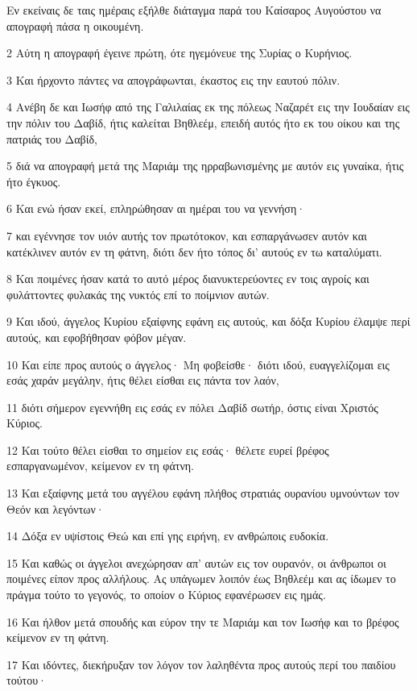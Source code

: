 \par Εν εκείναις δε ταις ημέραις εξήλθε διάταγμα παρά του Καίσαρος Αυγούστου να απογραφή πάσα η οικουμένη.
\par 2 Αύτη η απογραφή έγεινε πρώτη, ότε ηγεμόνευε της Συρίας ο Κυρήνιος.
\par 3 Και ήρχοντο πάντες να απογράφωνται, έκαστος εις την εαυτού πόλιν.
\par 4 Ανέβη δε και Ιωσήφ από της Γαλιλαίας εκ της πόλεως Ναζαρέτ εις την Ιουδαίαν εις την πόλιν του Δαβίδ, ήτις καλείται Βηθλεέμ, επειδή αυτός ήτο εκ του οίκου και της πατριάς του Δαβίδ,
\par 5 διά να απογραφή μετά της Μαριάμ της ηρραβωνισμένης με αυτόν εις γυναίκα, ήτις ήτο έγκυος.
\par 6 Και ενώ ήσαν εκεί, επληρώθησαν αι ημέραι του να γεννήση·
\par 7 και εγέννησε τον υιόν αυτής τον πρωτότοκον, και εσπαργάνωσεν αυτόν και κατέκλινεν αυτόν εν τη φάτνη, διότι δεν ήτο τόπος δι' αυτούς εν τω καταλύματι.
\par 8 Και ποιμένες ήσαν κατά το αυτό μέρος διανυκτερεύοντες εν τοις αγροίς και φυλάττοντες φυλακάς της νυκτός επί το ποίμνιον αυτών.
\par 9 Και ιδού, άγγελος Κυρίου εξαίφνης εφάνη εις αυτούς, και δόξα Κυρίου έλαμψε περί αυτούς, και εφοβήθησαν φόβον μέγαν.
\par 10 Και είπε προς αυτούς ο άγγελος· Μη φοβείσθε· διότι ιδού, ευαγγελίζομαι εις εσάς χαράν μεγάλην, ήτις θέλει είσθαι εις πάντα τον λαόν,
\par 11 διότι σήμερον εγεννήθη εις εσάς εν πόλει Δαβίδ σωτήρ, όστις είναι Χριστός Κύριος.
\par 12 Και τούτο θέλει είσθαι το σημείον εις εσάς· θέλετε ευρεί βρέφος εσπαργανωμένον, κείμενον εν τη φάτνη.
\par 13 Και εξαίφνης μετά του αγγέλου εφάνη πλήθος στρατιάς ουρανίου υμνούντων τον Θεόν και λεγόντων·
\par 14 Δόξα εν υψίστοις Θεώ και επί γης ειρήνη, εν ανθρώποις ευδοκία.
\par 15 Και καθώς οι άγγελοι ανεχώρησαν απ' αυτών εις τον ουρανόν, οι άνθρωποι οι ποιμένες είπον προς αλλήλους. Ας υπάγωμεν λοιπόν έως Βηθλεέμ και ας ίδωμεν το πράγμα τούτο το γεγονός, το οποίον ο Κύριος εφανέρωσεν εις ημάς.
\par 16 Και ήλθον μετά σπουδής και εύρον την τε Μαριάμ και τον Ιωσήφ και το βρέφος κείμενον εν τη φάτνη.
\par 17 Και ιδόντες, διεκήρυξαν τον λόγον τον λαληθέντα προς αυτούς περί του παιδίου τούτου·
